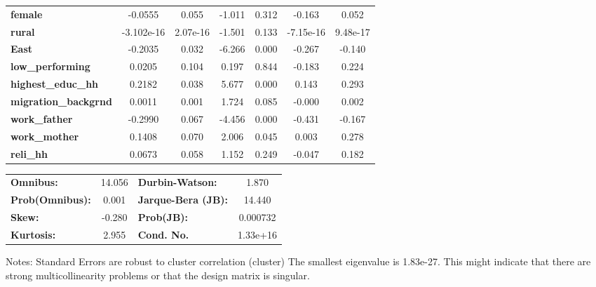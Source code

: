 \begin{center}
\begin{tabular}{lcccccc}
\textbf{female}                          &      -0.0555  &        0.055     &    -1.011  &         0.312        &       -0.163    &        0.052     \\
\textbf{rural}                           &   -3.102e-16  &     2.07e-16     &    -1.501  &         0.133        &    -7.15e-16    &     9.48e-17     \\
\textbf{East}                            &      -0.2035  &        0.032     &    -6.266  &         0.000        &       -0.267    &       -0.140     \\
\textbf{low\_performing}                 &       0.0205  &        0.104     &     0.197  &         0.844        &       -0.183    &        0.224     \\
\textbf{highest\_educ\_hh}               &       0.2182  &        0.038     &     5.677  &         0.000        &        0.143    &        0.293     \\
\textbf{migration\_backgrnd}             &       0.0011  &        0.001     &     1.724  &         0.085        &       -0.000    &        0.002     \\
\textbf{work\_father}                    &      -0.2990  &        0.067     &    -4.456  &         0.000        &       -0.431    &       -0.167     \\
\textbf{work\_mother}                    &       0.1408  &        0.070     &     2.006  &         0.045        &        0.003    &        0.278     \\
\textbf{reli\_hh}                        &       0.0673  &        0.058     &     1.152  &         0.249        &       -0.047    &        0.182     \\
\bottomrule
\end{tabular}
\begin{tabular}{lclc}
\textbf{Omnibus:}       & 14.056 & \textbf{  Durbin-Watson:     } &    1.870  \\
\textbf{Prob(Omnibus):} &  0.001 & \textbf{  Jarque-Bera (JB):  } &   14.440  \\
\textbf{Skew:}          & -0.280 & \textbf{  Prob(JB):          } & 0.000732  \\
\textbf{Kurtosis:}      &  2.955 & \textbf{  Cond. No.          } & 1.33e+16  \\
\bottomrule
\end{tabular}
\end{center}

Notes: \newline
 [1] Standard Errors are robust to cluster correlation (cluster) \newline
 [2] The smallest eigenvalue is 1.83e-27. This might indicate that there are \newline
 strong multicollinearity problems or that the design matrix is singular.
